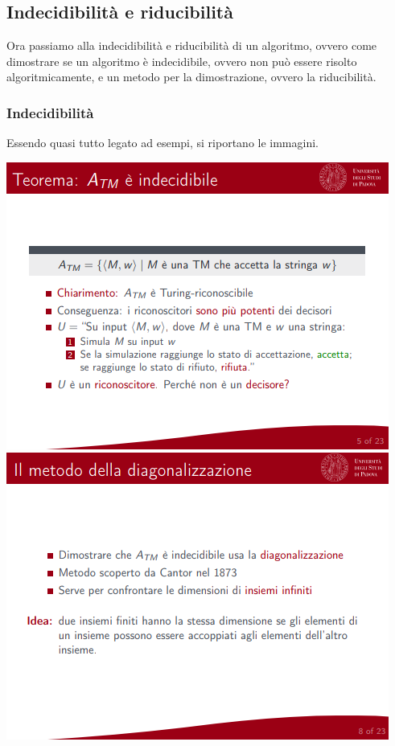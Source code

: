 \documentclass[]{article}
\begin{document}
		\subsection{Indecidibilità e riducibilità}
			Ora passiamo alla indecidibilità e riducibilità di un algoritmo, ovvero come dimostrare se un algoritmo è indecidibile, ovvero non può essere risolto algoritmicamente, e un metodo per la dimostrazione, ovvero la riducibilità.
			\subsubsection{Indecidibilità}
				Essendo quasi tutto legato ad esempi, si riportano le immagini.
				\begin{center}
					\includegraphics[scale=0.8]{indecidibile1.png}
					\includegraphics[scale=0.8]{indecidibile2.png}

\end{center}
\end{document}
